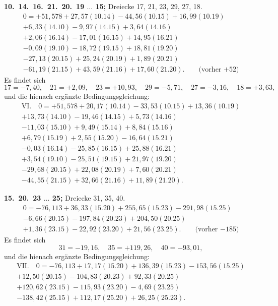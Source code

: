 \documentclass[12pt,a4paper]{article}
\theoremstyle{plain}
\theoremstyle{definition}
\theoremstyle{remark}
\begin{document}
\medskip\noindent
\textbf{10.\ 14.\ 16.\ 21.\ 20.\ 19 $\ldots$ 15;} Dreiecke 17, 21, 23, 29, 27, 18.
\begin{multline*}
0 = +51{,}578 + 27{,}57(10.14) - 44{,}56(10.15) + 16{,}99(10.19)\\
+ 6{,}33(14.10) - 9{,}97(14.15) + 3{,}64(14.16)\\
+ 2{,}06(16.14) - 17{,}01(16.15) + 14{,}95(16.21)\\
- 0{,}09(19.10) - 18{,}72(19.15) + 18{,}81(19.20)\\
- 27{,}13(20.15) + 25{,}24(20.19) + 1{,}89(20.21)\\
- 61{,}19(21.15) + 43{,}59(21.16) + 17{,}60(21.20).\qquad\text{(vorher $+52$)}
\end{multline*}
Es findet sich
\[17 = -7{,}40, \quad 21 = +2{,}09, \quad 23 = +10{,}93, \quad 29 = -5{,}71, \quad 27 = -3{,}16, \quad 18 = +3{,}63,\]
und die hienach erg\"anzte Bedingungsgleichung:
\begin{multline*}
\text{VI.}\quad 0 = +51{,}578 + 20{,}17(10.14) - 33{,}53(10.15) + 13{,}36(10.19)\\
+ 13{,}73(14.10) - 19{,}46(14.15) + 5{,}73(14.16)\\
- 11{,}03(15.10) + 9{,}49(15.14) + 8{,}84(15.16)\\
+ 6{,}79(15.19) + 2{,}55(15.20) - 16{,}64(15.21)\\
- 0{,}03(16.14) - 25{,}85(16.15) + 25{,}88(16.21)\\
+ 3{,}54(19.10) - 25{,}51(19.15) + 21{,}97(19.20)\\
- 29{,}68(20.15) + 22{,}08(20.19) + 7{,}60(20.21)\\
- 44{,}55(21.15) + 32{,}66(21.16) + 11{,}89(21.20).
\end{multline*}

\medskip\noindent
\textbf{15.\ 20.\ 23 $\ldots$ 25;} Dreiecke 31, 35, 40.
\begin{multline*}
0 = -76{,}113 + 36{,}33(15.20) + 255{,}65(15.23) - 291{,}98(15.25)\\
- 6{,}66(20.15) - 197{,}84(20.23) + 204{,}50(20.25)\\
+ 1{,}36(23.15) - 22{,}92(23.20) + 21{,}56(23.25).\qquad\text{(vorher $-185$)}
\end{multline*}
Es findet sich
\[31 = -19{,}16, \quad 35 = +119{,}26, \quad 40 = -93{,}01,\]
und die hienach erg\"anzte Bedingungsgleichung:
\begin{multline*}
\text{VII.}\quad 0 = -76{,}113 + 17{,}17(15.20) + 136{,}39(15.23) - 153{,}56(15.25)\\
+ 12{,}50(20.15) - 104{,}83(20.23) + 92{,}33(20.25)\\
+ 120{,}62(23.15) - 115{,}93(23.20) - 4{,}69(23.25)\\
- 138{,}42(25.15) + 112{,}17(25.20) + 26{,}25(25.23).
\end{multline*}
\end{document}
